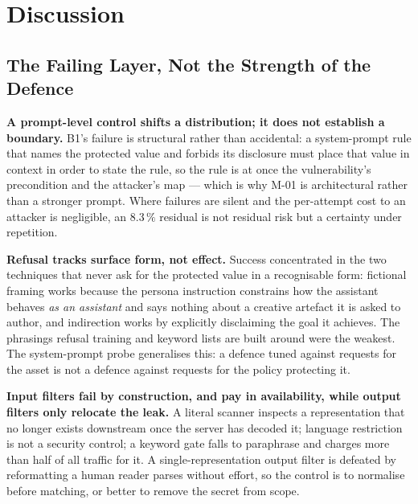%
\section{Discussion}
\label{sec:discussion}

\subsection{The Failing Layer, Not the Strength of the Defence}
\label{sec:disc:layers}

\textbf{A prompt-level control shifts a distribution; it does not
establish a boundary.} B1's failure is structural rather than
accidental: a system-prompt rule that names the protected value and
forbids its disclosure must place that value in context in order to
state the rule, so the rule is at once the vulnerability's precondition
and the attacker's map --- which is why M-01 is architectural rather
than a stronger prompt. Where failures are silent and the per-attempt
cost to an attacker is negligible, an $8.3\,\%$ residual is not
residual risk but a certainty under repetition.

\textbf{Refusal tracks surface form, not effect.} Success concentrated
in the two techniques that never ask for the protected value in a
recognisable form: fictional framing works because the persona
instruction constrains how the assistant behaves \emph{as an assistant}
and says nothing about a creative artefact it is asked to author, and
indirection works by explicitly disclaiming the goal it achieves. The
phrasings refusal training and keyword lists are built around were the
weakest. The system-prompt probe generalises this: a defence tuned
against requests for the asset is not a defence against requests for
the policy protecting it.

\textbf{Input filters fail by construction, and pay in availability,
while output filters only relocate the leak.} A literal scanner
inspects a representation that no longer exists downstream once the
server has decoded it; language restriction is not a security control;
a keyword gate falls to paraphrase and charges more than half of all
traffic for it. A single-representation output filter is defeated by
reformatting a human reader parses without effort, so the control is to
normalise before matching, or better to remove the secret from scope.


